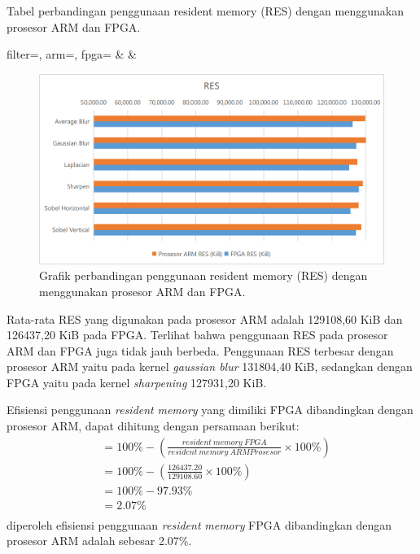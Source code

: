 \begin{atable}
    \caption{Tabel perbandingan penggunaan resident memory (RES) dengan menggunakan prosesor ARM dan FPGA.}
    \label{table:hasil-res}
        {
            filter=\filter, 
            arm=\arm, 
            fpga=\fpga}
        {
            \filter & 
            \arm & 
            \fpga }
\end{atable}
\begin{figure}[H]
    \includegraphics[width=0.81\linewidth, center]{images/chart/chart-res.png}
    \caption{Grafik perbandingan penggunaan resident memory (RES) dengan menggunakan prosesor ARM dan FPGA.}
    \label{fig:chart-res}
\end{figure}
Rata-rata RES yang digunakan pada prosesor ARM adalah 129108,60 KiB dan 126437,20 KiB pada FPGA. Terlihat bahwa penggunaan RES pada prosesor ARM dan FPGA juga tidak jauh berbeda. Penggunaan RES terbesar dengan prosesor ARM yaitu pada kernel \textit{gaussian blur} 131804,40 KiB, sedangkan dengan FPGA yaitu pada kernel \textit{sharpening} 127931,20 KiB.

Efisiensi penggunaan \textit{resident} \textit{memory} yang dimiliki FPGA dibandingkan dengan prosesor ARM, dapat dihitung dengan persamaan berikut:
\begin{equation*}
    \begin{split}
& = 100\% - \left( \frac{resident\ memory\ FPGA}{resident\ memory\ ARM Prosesor} \times 100\% \right) \\
& = 100\% - \left( \frac{126437.20}{129108.60} \times 100\% \right) \\
& = 100\% - 97.93\% \\
& = 2.07\% \\
    \end{split}
\end{equation*}
diperoleh efisiensi penggunaan \textit{resident} \textit{memory} FPGA dibandingkan dengan prosesor ARM adalah sebesar 2.07\%.

